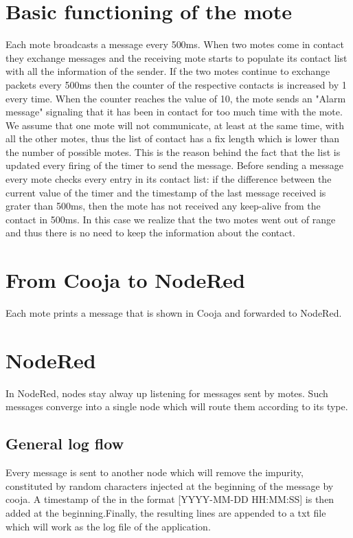 \documentclass[12pt]{article}
\begin{document}
\section{Basic functioning of the mote}
Each mote broadcasts a message every 500ms.\newline
When two motes come in contact they exchange messages and the receiving mote starts to populate its contact list with all the information of the sender.\newline
If the two motes continue to exchange packets every 500ms then the counter of the respective contacts is increased by 1 every time. When the counter reaches the value of 10, the mote sends an "Alarm message" signaling that it has been in contact for too much time with the mote.\newline
We assume that one mote will not communicate, at least at the same time, with all the other motes, thus the list of contact has a fix length which is lower than the number  of possible motes.
This is the reason behind the fact that the list is updated every firing of the timer to send the message.\newline
Before sending a message every mote checks every entry in its contact list: if the difference between the current value of the timer and the timestamp of the last message received is grater than 500ms, then the mote has not received any keep-alive from the contact in 500ms. In this case we realize that the two motes went out of range and thus there is no need to keep the information about the contact.


\section{From Cooja to NodeRed}
Each mote prints a message that is shown in Cooja and forwarded to NodeRed.

\section{NodeRed}

In NodeRed, nodes stay alway up listening for messages sent by motes. Such messages converge into a single node which will route them according to its type.

\subsection{General log flow}
Every message is sent to another node which will remove the impurity, constituted by random characters injected at the beginning of the message by cooja. A timestamp of the in the format [YYYY-MM-DD HH:MM:SS] is then added at the beginning.Finally, the resulting lines are appended to a txt file which will work as the log file of the application.
\end{document}
